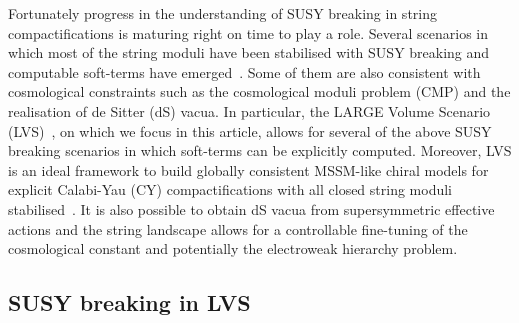 \documentclass[11pt,a4paper]{article}
\begin{document}
Fortunately progress in the understanding of SUSY breaking in string compactifications is maturing right on time to play a role.
Several scenarios in which most of the string moduli have been stabilised
with SUSY breaking and computable soft-terms have emerged~\cite{Choi:2005ge,Nilles:1997cm,Conlon:2006us,Conlon:2006wz, Lowen:2008fm, deAlwis:2009fn, Cicoli:2013rwa,Acharya:2008zi}.
Some of them are also consistent with cosmological constraints such as the cosmological moduli problem (CMP) and the realisation of de Sitter (dS) vacua.
In particular, the LARGE Volume Scenario (LVS)~\cite{Balasubramanian:2005zx}, on which we focus in this article,
allows for several of the above SUSY breaking scenarios in which soft-terms can be explicitly computed.
Moreover, LVS is an ideal framework to build globally consistent MSSM-like chiral models for explicit
Calabi-Yau (CY) compactifications with all closed string moduli stabilised~\cite{Cicoli:2011qg,Cicoli:2012vw,Cicoli:2013mpa,Cicoli:2013cha}.
It is also possible to obtain dS vacua from supersymmetric effective actions \cite{Cicoli:2012fh,Cicoli:2012vw} and the string landscape allows for a controllable fine-tuning of the cosmological constant and potentially the electroweak hierarchy problem.

\subsection{SUSY breaking in LVS}
\end{document}
